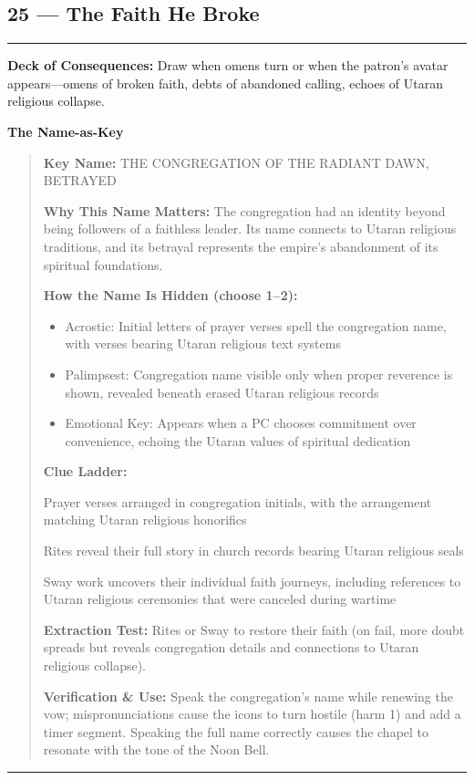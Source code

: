 \documentclass[18pt, letterpaper, twoside]{article}
\newenvironment{floorbox}[1]{%
    \begin{center}
    \begin{minipage}{0.95\textwidth}
    \subsection*{#1}
    \vspace{-0.5em}
    \rule{\textwidth}{0.5pt}
    \vspace{0.5em}
}{%
    \vspace{0.5em}
    \rule{\textwidth}{0.5pt}
    \end{minipage}
    \end{center}
}
\newenvironment{gmnote}[1]{%
    \vspace{0.5em}
    \noindent\textbf{#1}
    \begin{quote}
}{%
    \end{quote}
    \vspace{0.5em}
}
\newcommand{\deckdraw}[1]{\noindent\textbf{Deck of Consequences:} #1\par}
\newcommand{\keyname}[1]{\noindent\textbf{Key Name:} #1\par}
\newcommand{\nameimportance}[1]{\noindent\textbf{Why This Name Matters:} #1\par}
\begin{document}
\begin{floorbox}{25 --- The Faith He Broke}
\deckdraw{Draw when omens turn or when the patron's avatar appears---omens of broken faith, debts of abandoned calling, echoes of Utaran religious collapse.}

\begin{gmnote}{The Name-as-Key}
\keyname{THE CONGREGATION OF THE RADIANT DAWN, BETRAYED}
\nameimportance{The congregation had an identity beyond being followers of a faithless leader. Its name connects to Utaran religious traditions, and its betrayal represents the empire's abandonment of its spiritual foundations.}

\textbf{How the Name Is Hidden (choose 1--2):}
\begin{itemize}[leftmargin=*]
    \item Acrostic: Initial letters of prayer verses spell the congregation name, with verses bearing Utaran religious text systems
    \item Palimpsest: Congregation name visible only when proper reverence is shown, revealed beneath erased Utaran religious records
    \item Emotional Key: Appears when a PC chooses commitment over convenience, echoing the Utaran values of spiritual dedication
\end{itemize}

\textbf{Clue Ladder:}
\begin{description}[leftmargin=*, style=unboxed]
    \item[Gentle Nudge:] Prayer verses arranged in congregation initials, with the arrangement matching Utaran religious honorifics
    \item[Actionable Lead:] Rites reveal their full story in church records bearing Utaran religious seals
    \item[Aha! Proof:] Sway work uncovers their individual faith journeys, including references to Utaran religious ceremonies that were canceled during wartime
\end{description}

\textbf{Extraction Test:} Rites or Sway to restore their faith (on fail, more doubt spreads but reveals congregation details and connections to Utaran religious collapse).

\textbf{Verification \& Use:} Speak the congregation's name while renewing the vow; mispronunciations cause the icons to turn hostile (harm 1) and add a timer segment. Speaking the full name correctly causes the chapel to resonate with the tone of the Noon Bell.
\end{gmnote}


\end{floorbox}
\end{document}
